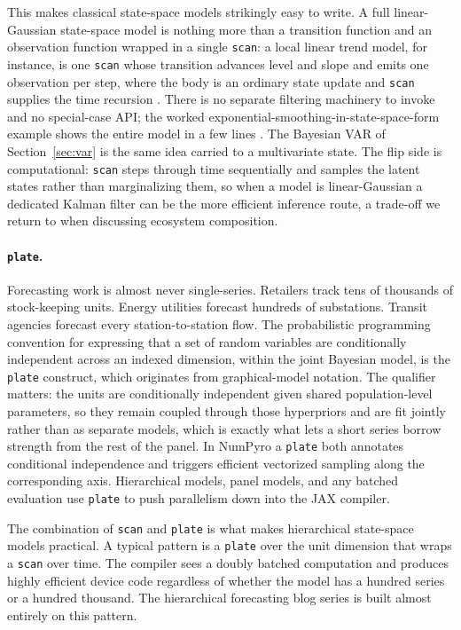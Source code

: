 \documentclass[11pt,3p,review,authoryear]{elsarticle}
\begin{document}
This makes classical state-space models strikingly easy to write. A full linear-Gaussian state-space model is nothing more than a transition function and an observation function wrapped in a single \texttt{scan}: a local linear trend model, for instance, is one \texttt{scan} whose transition advances level and slope and emits one observation per step, where the body is an ordinary state update and \texttt{scan} supplies the time recursion \citep{orduz_exponential_smoothing_ssm}. There is no separate filtering machinery to invoke and no special-case API; the worked exponential-smoothing-in-state-space-form example shows the entire model in a few lines \citep{orduz_exponential_smoothing_ssm, numpyro_time_series}. The Bayesian VAR of Section~\ref{sec:var} is the same idea carried to a multivariate state. The flip side is computational: \texttt{scan} steps through time sequentially and samples the latent states rather than marginalizing them, so when a model is linear-Gaussian a dedicated Kalman filter can be the more efficient inference route, a trade-off we return to when discussing ecosystem composition.

\paragraph{\texttt{plate}.}
Forecasting work is almost never single-series. Retailers track tens of thousands of stock-keeping units. Energy utilities forecast hundreds of substations. Transit agencies forecast every station-to-station flow. The probabilistic programming convention for expressing that a set of random variables are conditionally independent across an indexed dimension, within the joint Bayesian model, is the \texttt{plate} construct, which originates from graphical-model notation. The qualifier matters: the units are conditionally independent given shared population-level parameters, so they remain coupled through those hyperpriors and are fit jointly rather than as separate models, which is exactly what lets a short series borrow strength from the rest of the panel. In NumPyro a \texttt{plate} both annotates conditional independence and triggers efficient vectorized sampling along the corresponding axis. Hierarchical models, panel models, and any batched evaluation use \texttt{plate} to push parallelism down into the JAX compiler.

The combination of \texttt{scan} and \texttt{plate} is what makes hierarchical state-space models practical. A typical pattern is a \texttt{plate} over the unit dimension that wraps a \texttt{scan} over time. The compiler sees a doubly batched computation and produces highly efficient device code regardless of whether the model has a hundred series or a hundred thousand. The hierarchical forecasting blog series \citep{orduz_hierarchical_1, orduz_hierarchical_2, orduz_hierarchical_3} is built almost entirely on this pattern.
\end{document}
